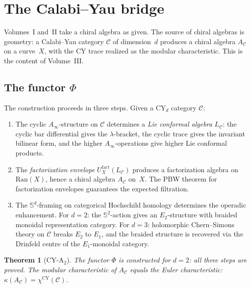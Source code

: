 \documentclass[11pt,reqno]{amsart}
\newtheorem{theorem}{Theorem}[section]
\theoremstyle{definition}
\theoremstyle{remark}
\newcommand{\Ran}{\mathrm{Ran}}
\numberwithin{equation}{section}
\begin{document}
\section{The Calabi--Yau bridge}
\label{sec:cy-bridge}

Volumes~I and~II take a chiral algebra as given. The source
of chiral algebras is geometry: a Calabi--Yau category
$\mathcal{C}$ of dimension~$d$ produces a chiral algebra
$A_\mathcal{C}$ on a curve~$X$, with the CY trace realized
as the modular characteristic. This is the content of
Volume~III.

\subsection{The functor $\Phi$}
\label{ssec:functor-phi}

The construction proceeds in three steps. Given a CY$_d$
category $\mathcal{C}$:

\begin{enumerate}[(1)]
\item The cyclic $A_\infty$-structure on $\mathcal{C}$
 determines a \emph{Lie conformal algebra} $L_\mathcal{C}$:
 the cyclic bar differential gives the $\lambda$-bracket,
 the cyclic trace gives the invariant bilinear form, and
 the higher $A_\infty$-operations give higher Lie conformal
 products.

\item The \emph{factorization envelope}
 $U_X^{\mathrm{fact}}(L_\mathcal{C})$ produces a
 factorization algebra on $\Ran(X)$, hence a chiral algebra
 $A_\mathcal{C}$ on~$X$. The PBW theorem for factorization
 envelopes guarantees the expected filtration.

\item The $\mathbb{S}^d$-framing on categorical Hochschild homology
 determines the operadic enhancement. For $d = 2$: the
 $\mathbb{S}^2$-action gives an $E_2$-structure with braided
 monoidal representation category. For $d = 3$: holomorphic
 Chern--Simons theory on $\mathcal{C}$ breaks $E_2$ to $E_1$,
 and the braided structure is recovered via the Drinfeld centre
 of the $E_1$-monoidal category.
\end{enumerate}

\begin{theorem}[CY-A$_2$]
\label{thm:cy-a2}
The functor $\Phi$ is constructed for $d = 2$: all three steps
are proved. The modular characteristic of $A_\mathcal{C}$
equals the Euler characteristic:
$\kappa(A_\mathcal{C}) = \chi^{\mathrm{CY}}(\mathcal{C})$.
\end{theorem}
\end{document}
